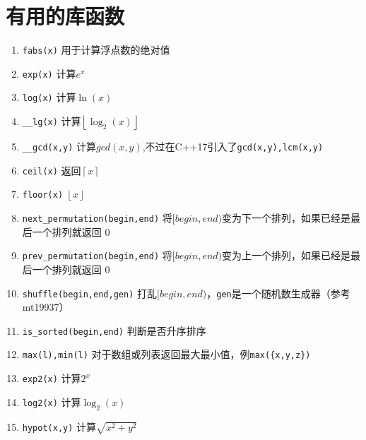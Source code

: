 \section{有用的库函数}


\begin{enumerate}
    \item \verb|fabs(x)| 用于计算浮点数的绝对值
    \item \verb|exp(x)| 计算$e^x$
    \item \verb|log(x)| 计算$\ln(x)$
    \item \verb|__lg(x)| 计算$\left \lfloor \log_2(x) \right \rfloor $
    \item \verb|__gcd(x,y)| 计算$gcd(x,y)$,不过在C++17引入了\verb|gcd(x,y),lcm(x,y)|
    \item \verb|ceil(x)| 返回$\left \lceil x \right \rceil$
    \item \verb|floor(x)| $\left \lfloor x \right \rfloor$
    \item \verb|next_permutation(begin,end)| 将$[begin,end)$变为下一个排列，如果已经是最后一个排列就返回 0
    \item \verb|prev_permutation(begin,end)| 将$[begin,end)$变为上一个排列，如果已经是最后一个排列就返回 0
    \item \verb|shuffle(begin,end,gen)| 打乱$[begin,end)$，\verb|gen|是一个随机数生成器（参考mt19937）
    \item \verb|is_sorted(begin,end)| 判断是否升序排序
    \item \verb|max(l),min(l)| 对于数组或列表返回最大最小值，例\verb|max({x,y,z})|
    \item \verb|exp2(x)| 计算$2^x$
    \item \verb|log2(x)| 计算$\log_2(x)$
    \item \verb|hypot(x,y)| 计算$\sqrt{x^2+y^2}$
\end{enumerate}

